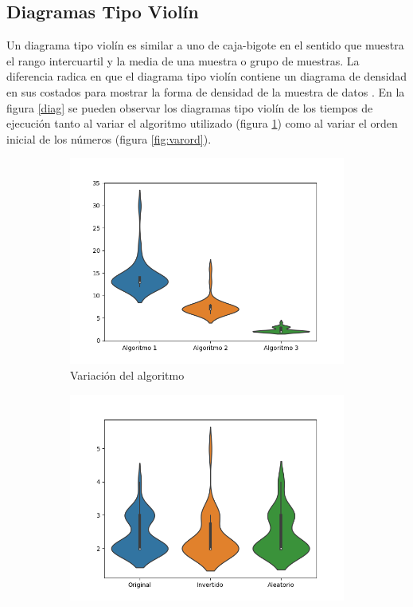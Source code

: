 \documentclass{article}
\begin{document}
\subsection{Diagramas Tipo Viol\'in}\label{vio}
Un diagrama tipo viol\'in es similar a uno de caja-bigote en el sentido que muestra el rango intercuartil y la media de una muestra o grupo de muestras. La diferencia radica en que el diagrama tipo viol\'in contiene un diagrama de densidad en sus costados para mostrar la forma de densidad de la muestra de datos \cite{wiki2}. En la figura \ref{diag} se pueden observar los diagramas tipo viol\'in de los tiempos de ejecuci\'on tanto al variar el algoritmo utilizado (figura \ref{fig:varalg}) como al variar el orden inicial de los n\'umeros (figura \ref{fig:varord}).

\begin{figure}[h]
     \centering
     \begin{subfigure}[b]{0.49\textwidth}
         \centering
         \includegraphics[width=\textwidth]{AlgorithmVariation.png}
         \caption{Variaci\'on del algoritmo}
         \label{fig:varalg}
     \end{subfigure}
     \begin{subfigure}[b]{0.49\textwidth}
         \centering
         \includegraphics[width=\textwidth]{OrderVariation.png}

\end{subfigure}
\end{figure}
\end{document}
